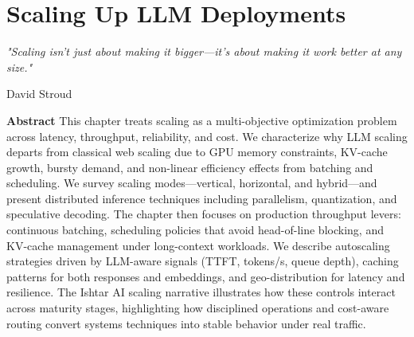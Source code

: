 \chapter{Scaling Up LLM Deployments}
\label{ch:scaling}
\newrefsegment


\epigraph{\emph{"Scaling isn't just about making it bigger—it's about making it work better at any size."}}{David Stroud}

\textbf{Abstract} This chapter treats scaling as a multi-objective optimization problem across latency, throughput, reliability, and cost. We characterize why LLM scaling departs from classical web scaling due to GPU memory constraints, KV-cache growth, bursty demand, and non-linear efficiency effects from batching and scheduling. We survey scaling modes—vertical, horizontal, and hybrid—and present distributed inference techniques including parallelism, quantization, and speculative decoding. The chapter then focuses on production throughput levers: continuous batching, scheduling policies that avoid head-of-line blocking, and KV-cache management under long-context workloads. We describe autoscaling strategies driven by LLM-aware signals (TTFT, tokens/s, queue depth), caching patterns for both responses and embeddings, and geo-distribution for latency and resilience. The Ishtar AI scaling narrative illustrates how these controls interact across maturity stages, highlighting how disciplined operations and cost-aware routing convert systems techniques into stable behavior under real traffic.

